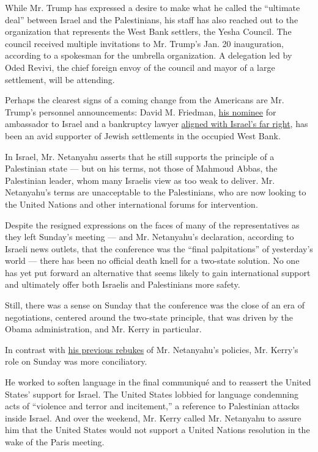 While Mr. Trump has expressed a desire to make what he called the
``ultimate deal'' between Israel and the Palestinians, his staff has
also reached out to the organization that represents the West Bank
settlers, the Yesha Council. The council received multiple invitations
to Mr. Trump's Jan. 20 inauguration, according to a spokesman for the
umbrella organization. A delegation led by Oded Revivi, the chief
foreign envoy of the council and mayor of a large settlement, will be
attending.

Perhaps the clearest signs of a coming change from the Americans are Mr.
Trump's personnel announcements: David M. Friedman,
\href{https://www.nytimes.com/2016/12/15/us/politics/donald-trump-david-friedman-israel-ambassador.html}{his
nominee} for ambassador to Israel and a bankruptcy lawyer
\href{https://www.nytimes.com/2016/12/16/world/middleeast/david-friedman-us-ambassador-israel.html}{aligned
with Israel's far right}, has been an avid supporter of Jewish
settlements in the occupied West Bank.

In Israel, Mr. Netanyahu asserts that he still supports the principle of
a Palestinian state --- but on his terms, not those of Mahmoud Abbas,
the Palestinian leader, whom many Israelis view as too weak to deliver.
Mr. Netanyahu's terms are unacceptable to the Palestinians, who are now
looking to the United Nations and other international forums for
intervention.

Despite the resigned expressions on the faces of many of the
representatives as they left Sunday's meeting --- and Mr. Netanyahu's
declaration, according to Israeli news outlets, that the conference was
the ``final palpitations'' of yesterday's world --- there has been no
official death knell for a two-state solution. No one has yet put
forward an alternative that seems likely to gain international support
and ultimately offer both Israelis and Palestinians more safety.

Still, there was a sense on Sunday that the conference was the close of
an era of negotiations, centered around the two-state principle, that
was driven by the Obama administration, and Mr. Kerry in particular.

In contrast with
\href{https://www.nytimes.com/2016/12/28/us/politics/john-kerry-israel-palestine-peace.html}{his
previous rebukes} of Mr. Netanyahu's policies, Mr. Kerry's role on
Sunday was more conciliatory.

He worked to soften language in the final communiqué and to reassert the
United States' support for Israel. The United States lobbied for
language condemning acts of ``violence and terror and incitement,'' a
reference to Palestinian attacks inside Israel. And over the weekend,
Mr. Kerry called Mr. Netanyahu to assure him that the United States
would not support a United Nations resolution in the wake of the Paris
meeting.

